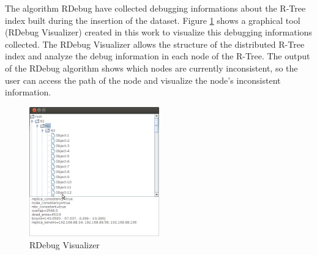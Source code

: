 The algorithm RDebug have collected debugging informations about the R-Tree index built during the insertion of the dataset.
Figure \ref{fig:rdebug-vis} shows a graphical tool (RDebug Visualizer) created in this work to visualize this debugging informations collected.
The RDebug Visualizer allows the structure of the distributed R-Tree index and analyze the debug information in each node of the R-Tree. 
The output of the RDebug algorithm shows which nodes are currently inconsistent, so the user can access the path of the node and visualize the node's inconsistent information.    

\begin{figure}[ht]
  \centering
  \includegraphics[width=0.5\textwidth]{rdebug-vis.jpg}
  \caption{RDebug Visualizer}
  \label{fig:rdebug-vis}
\end{figure}



